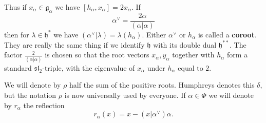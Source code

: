 \documentclass[12pt]{article}
\begin{document}
Thus if $x_\alpha \in \mathfrak{g}_\alpha$ we have $[h_\alpha, x_\alpha] = 2x_\alpha$. If
\[
    \alpha^\vee = \frac{2\alpha}{(\alpha|\alpha)}
\]
then for $\lambda \in \mathfrak{h}^*$ we have $(\alpha^\vee | \lambda) = \lambda(h_\alpha)$. Either $\alpha^\vee$ or $h_\alpha$ is called a \textbf{coroot}. They are really the same thing if we identify $\mathfrak{h}$ with its double dual $\mathfrak{h}^{**}$. The factor $\tfrac{2}{(\alpha|\alpha)}$ is chosen so that the root vectors $x_\alpha, y_\alpha$ together with $h_\alpha$ form a standard $\mathfrak{sl}_2$-triple, with the eigenvalue of $x_\alpha$ under $h_\alpha$ equal to $2$.

We will denote by $\rho$ half the sum of the positive roots. Humphreys denotes this $\delta$, but the notation $\rho$ is now universally used by everyone. If $\alpha \in \Phi$ we will denote by $r_\alpha$ the reflection
\[
    r_\alpha(x) = x - (x|\alpha^\vee)\alpha.
\]
\end{document}
